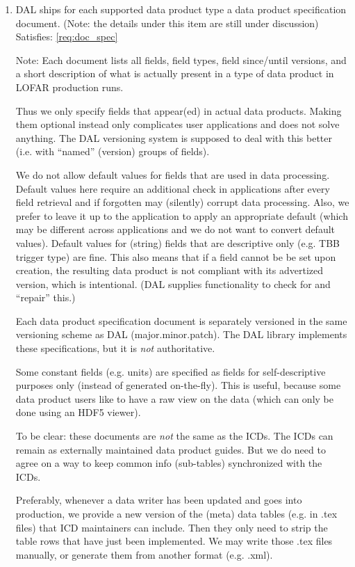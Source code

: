 \documentclass[a4paper,11pt]{article}
\begin{document}
\begin{enumerate}[resume, label=\it D.\arabic{*}]
\itemsep0em

\item \label{dsg:spec_docs} DAL ships for each supported data product type a data product specification document. (Note: the details under this item are still under discussion)\\
Satisfies: \ref{req:doc_spec}

Note: Each document lists all fields, field types, field since/until versions, and a short description of what is actually present in a type of data product in LOFAR production runs.

Thus we only specify fields that appear(ed) in actual data products.
Making them optional instead only complicates user applications and does not solve anything.
The DAL versioning system is supposed to deal with this better (i.e. with ``named'' (version) groups of fields).

We do not allow default values for fields that are used in data processing.
Default values here require an additional check in applications after every field retrieval and if forgotten may (silently) corrupt data processing.
Also, we prefer to leave it up to the application to apply an appropriate default (which may be different across applications and we do not want to convert default values).
Default values for (string) fields that are descriptive only (e.g. TBB trigger type) are fine.
This also means that if a field cannot be be set upon creation, the resulting data product is not compliant with its advertized version, which is intentional.
(DAL supplies functionality to check for and ``repair'' this.)

Each data product specification document is separately versioned in the same versioning scheme as DAL (major.minor.patch).
The DAL library implements these specifications, but it is \emph{not} authoritative.

Some constant fields (e.g. units) are specified as fields for self-descriptive purposes only (instead of generated on-the-fly).
This is useful, because some data product users like to have a raw view on the data (which can only be done using an HDF5 viewer).

To be clear: these documents are \emph{not} the same as the ICDs.
The ICDs can remain as externally maintained data product guides.
But we do need to agree on a way to keep common info (sub-tables) synchronized with the ICDs.

Preferably, whenever a data writer has been updated and goes into production, we provide a new version of the (meta) data tables (e.g. in .tex files) that ICD maintainers can include.
Then they only need to strip the table rows that have just been implemented.
We may write those .tex files manually, or generate them from another format (e.g. .xml).



\end{enumerate}
\end{document}
